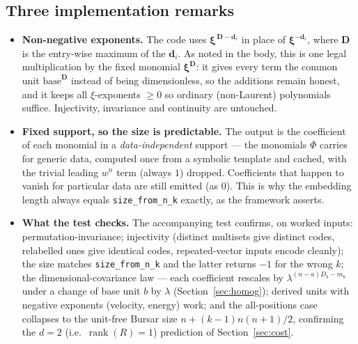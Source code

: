 \documentclass[11pt,a4paper]{article}
\theoremstyle{definition}
\theoremstyle{plain}
\newcommand{\bvec}[1]{\mathbf{#1}}
\begin{document}
\subsection*{Three implementation remarks}

\begin{itemize}[leftmargin=*]
\item \textbf{Non-negative exponents.} The code uses $\boldsymbol\xi^{\,\bvec D-\bvec
  d_i}$ in place of $\boldsymbol\xi^{-\bvec d_i}$, where $\bvec D$ is the
  entry-wise maximum of the $\bvec d_i$. As noted in the body, this is one legal
  multiplication by the fixed monomial $\boldsymbol\xi^{\bvec D}$: it gives every
  term the common unit $\text{base}^{\bvec D}$ instead of being dimensionless, so the
  additions remain honest, and it keeps all $\xi$-exponents $\ge0$ so ordinary
  (non-Laurent) polynomials suffice. Injectivity, invariance and continuity are
  untouched.
\item \textbf{Fixed support, so the size is predictable.} The output is the
  coefficient of each monomial in a \emph{data-independent} support --- the
  monomials $\Phi$ carries for generic data, computed once from a symbolic template
  and cached, with the trivial leading $w^n$ term (always $1$) dropped. Coefficients
  that happen to vanish for particular data are still emitted (as $0$). This is why
  the embedding length always equals \texttt{size\_from\_n\_k} exactly, as the
  framework asserts.
\item \textbf{What the test checks.} The accompanying test confirms, on worked
  inputs: permutation-invariance; injectivity (distinct multisets give distinct
  codes, relabelled ones give identical codes, repeated-vector inputs encode
  cleanly); the size matches \texttt{size\_from\_n\_k} and the latter returns $-1$
  for the wrong $k$; the dimensional-covariance law --- each coefficient rescales by
  $\lambda^{(n-a)D_b-m_b}$ under a change of base unit $b$ by $\lambda$
  (Section~\ref{sec:homog}); derived units with negative exponents (velocity,
  energy) work; and the all-positions case collapses to the unit-free Bursar size
  $n+(k-1)n(n+1)/2$, confirming the $d=2$ (i.e.\ $\operatorname{rank}(R)=1$)
  prediction of Section~\ref{sec:cost}.
\end{itemize}
\end{document}
